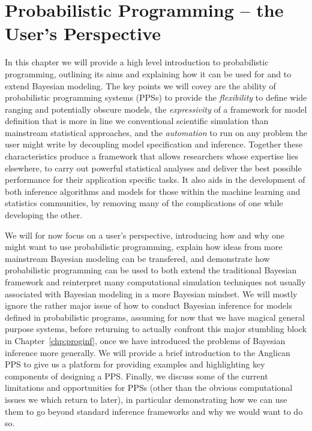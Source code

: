 
\chapter{Probabilistic Programming -- the User's Perspective}
\label{chp:probprog}

In this chapter we will provide a high level introduction to probabilistic programming,
outlining its aims and explaining how it can be used for and to extend Bayesian modeling.  The
key points we will covey are the ability of probabilistic programming systems (PPSs) to provide 
the \emph{flexibility} to define
wide ranging and potentially obscure models, the \emph{expressivity} of a framework for 
model definition that is more in line we conventional scientific simulation than mainstream 
statistical approaches, and the \emph{automation} to  run on any problem the user might write
by decoupling model specification and inference.
Together these characteristics produce a framework that allows researchers whose expertise 
lies elsewhere, to carry out powerful statistical analyses and deliver the best possible 
performance for their application specific tasks.  It also aids in the development of both inference
algorithms and models for those within the machine learning and statistics communities,
by removing many of the complications of one while developing the other.

We will for now focus on a user's perspective, introducing how and why one might want to use
probabilistic programming, explain how ideas from more mainstream Bayesian
modeling can be transfered, and demonstrate how probabilistic programming can be
used to both extend the traditional Bayesian framework and reinterpret many computational simulation
techniques not usually associated with Bayesian modeling in a more Bayesian mindset.
We will mostly ignore the rather major issue of how to conduct Bayesian inference for
models defined in probabilistic programs, assuming for now that we have magical
general purpose systems, before returning to actually confront this major stumbling
block in Chapter~\ref{chp:proginf}, once we have introduced the problems of Bayesian
inference more generally.  We will provide a brief introduction to the Anglican PPS
to give us a platform for providing examples and highlighting
key components of designing a PPS.  Finally, we discuss some of the current limitations
and opportunities for PPSs (other than the obvious computational
issues we which return to later), in particular demonstrating how we can use them to go beyond
standard inference frameworks and why we would want to do so.


